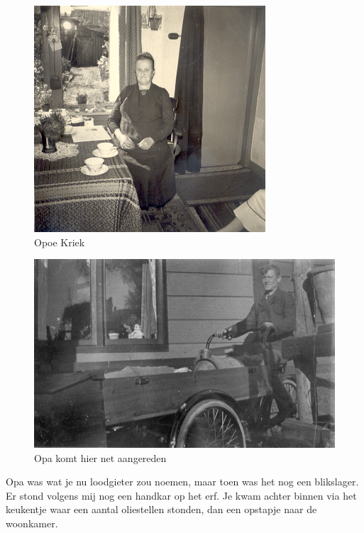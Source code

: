 \documentclass[10pt,twoside, openright]{memoir}
\begin{document}
\begin{figure}
\includegraphics[width=\textwidth]{img/ch3/opoekriek}
\caption*{\footnotesize Opoe Kriek}
\end{figure}

\begin{figure}
\includegraphics[width=\textwidth]{img/ch3/opakriek2}
\caption*{\footnotesize Opa komt hier net aangereden}
\end{figure}

Opa was wat je nu loodgieter zou noemen, maar toen was het nog een blikslager. Er stond volgens mij nog een handkar op het erf. Je kwam achter binnen via het keukentje waar een aantal oliestellen stonden, dan een opstapje naar de woonkamer. 
\end{document}
